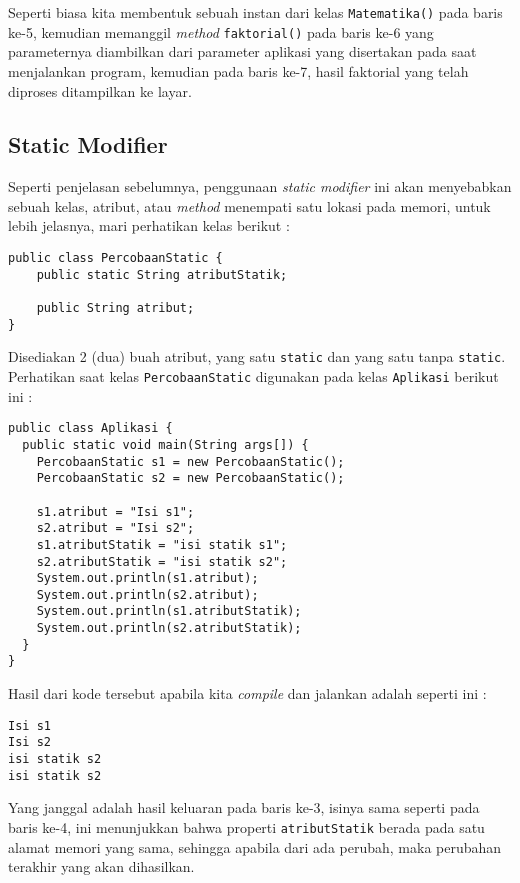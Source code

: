 Seperti biasa kita membentuk sebuah instan dari kelas \texttt{Matematika()} pada baris ke-5, kemudian memanggil \textit{method} \texttt{faktorial()} pada baris ke-6 yang parameternya diambilkan dari parameter aplikasi yang disertakan pada saat menjalankan program, kemudian pada baris ke-7, hasil faktorial yang telah diproses ditampilkan ke layar.

\subsection{Static Modifier}

Seperti penjelasan sebelumnya, penggunaan \textit{static modifier} ini akan menyebabkan sebuah kelas, atribut, atau \textit{method} menempati satu lokasi pada memori, untuk lebih jelasnya, mari perhatikan kelas berikut :

\begin{lstlisting}
public class PercobaanStatic {
    public static String atributStatik;

    public String atribut;
}
\end{lstlisting}

Disediakan 2 (dua) buah atribut, yang satu \texttt{static} dan yang satu tanpa \texttt{static}. Perhatikan saat kelas \texttt{PercobaanStatic} digunakan pada kelas \texttt{Aplikasi} berikut ini :

\begin{lstlisting}
public class Aplikasi {
  public static void main(String args[]) {
    PercobaanStatic s1 = new PercobaanStatic();
    PercobaanStatic s2 = new PercobaanStatic();
    
    s1.atribut = "Isi s1";
    s2.atribut = "Isi s2";
    s1.atributStatik = "isi statik s1";
    s2.atributStatik = "isi statik s2";
    System.out.println(s1.atribut);
    System.out.println(s2.atribut);
    System.out.println(s1.atributStatik);
    System.out.println(s2.atributStatik);
  }
}
\end{lstlisting}

Hasil dari kode tersebut apabila kita \textit{compile} dan jalankan adalah seperti ini :

\begin{lstlisting}
Isi s1
Isi s2
isi statik s2
isi statik s2
\end{lstlisting}

Yang janggal adalah hasil keluaran pada baris ke-3, isinya sama seperti pada baris ke-4, ini menunjukkan bahwa properti \texttt{atributStatik} berada pada satu alamat memori yang sama, sehingga apabila dari ada perubah, maka perubahan terakhir yang akan dihasilkan.


